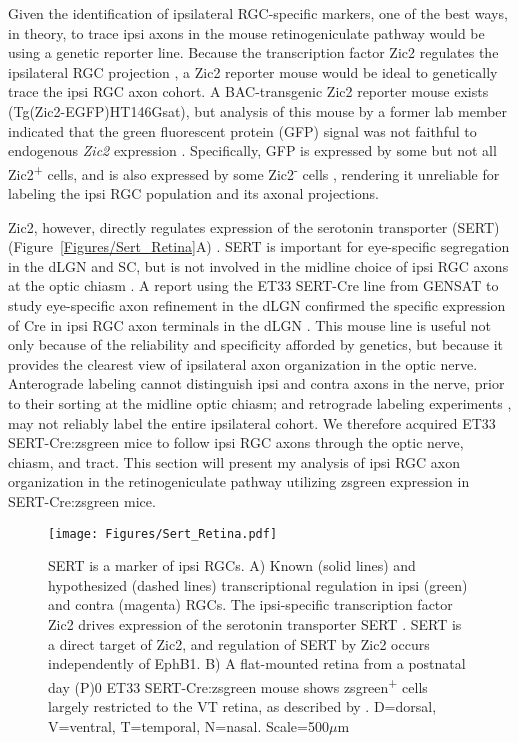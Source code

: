 \label{sec:SertCreResults}
Given the identification of ipsilateral RGC-specific markers, one of the best ways, in theory, to trace ipsi axons in the mouse retinogeniculate pathway would be using a genetic reporter line.
Because the transcription factor Zic2 regulates the ipsilateral RGC projection \cite{herrera2003zic2,williams2003ephrin}, a Zic2 reporter mouse would be ideal to genetically trace the ipsi RGC axon cohort.
A BAC-transgenic Zic2 reporter mouse exists (Tg(Zic2-EGFP)HT146Gsat), but analysis of this mouse by a former lab member indicated that the green fluorescent protein (GFP) signal was not faithful to endogenous \emph{Zic2} expression \cite{wang2013neuronal}.
Specifically, GFP is expressed by some but not all Zic2\textsuperscript{+} cells, and is also expressed by some Zic2\textsuperscript{-} cells \cite{wang2013neuronal}, rendering it unreliable for labeling the ipsi RGC population and its axonal projections.

Zic2, however, directly regulates expression of the serotonin transporter (SERT) (Figure~\ref{Figures/Sert_Retina}A) \cite{garcia2010zic2}.
SERT is important for eye-specific segregation in the dLGN and SC, but is not involved in the midline choice of ipsi RGC axons at the optic chiasm \cite{salichon2001excessive,upton1999excess,garcia2010zic2}.
A report using the ET33 SERT-Cre line from GENSAT to study eye-specific axon refinement in the dLGN confirmed the specific expression of Cre in ipsi RGC axon terminals in the dLGN \cite{koch2011pathway}.
This mouse line is useful not only because of the reliability and specificity afforded by genetics, but because it provides the clearest view of ipsilateral axon organization in the optic nerve.
Anterograde labeling cannot distinguish ipsi and contra axons in the nerve, prior to their sorting at the midline optic chiasm; and retrograde labeling experiments \cite{colello1990early}, may not reliably label the entire ipsilateral cohort.
We therefore acquired ET33 SERT-Cre:zsgreen mice to follow ipsi RGC axons through the optic nerve, chiasm, and tract.
This section will present my analysis of ipsi RGC axon organization in the retinogeniculate pathway utilizing zsgreen expression in SERT-Cre:zsgreen mice.

\begin{figure}[hbtp]
	\begin{center}
		\texttt{[image: Figures/Sert\_Retina.pdf]}
		\caption[SERT is a marker of ipsi RGCs.]
		{SERT is a marker of ipsi RGCs. 
		A) Known (solid lines) and hypothesized (dashed lines) transcriptional regulation in ipsi (green) and contra (magenta) RGCs.
		The ipsi-specific transcription factor Zic2 drives expression of the serotonin transporter SERT \cite{garcia2010zic2}.
		SERT is a direct target of Zic2, and regulation of SERT by Zic2 occurs independently of EphB1.
		B) A flat-mounted retina from a postnatal day (P)0 ET33 SERT-Cre:zsgreen mouse shows zsgreen\textsuperscript{+} cells largely restricted to the VT retina, as described by . 
		D=dorsal, V=ventral, T=temporal, N=nasal. 
		Scale=500$\mu$m}
		\label{Figures/SertRetina}
	\end{center}
\end{figure}


